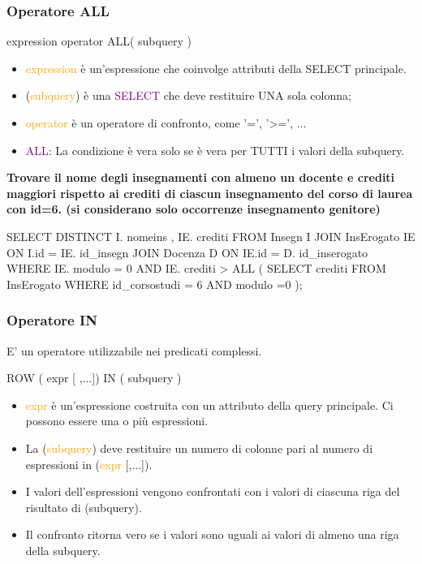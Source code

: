 \subsubsection{Operatore ALL}
\begin{codiceSQL}
  expression operator ALL( subquery )
\end{codiceSQL}

\begin{itemize}
  \item  \textcolor{orange}{expression} è un’espressione che coinvolge attributi della SELECT principale.
  \item (\textcolor{orange}{subquery}) è una \textcolor{purple}{SELECT} che deve restituire UNA sola colonna;
  \item \textcolor{orange}{operator} è un operatore di confronto, come ’=’, ’>=’, ...
  \item \textcolor{purple}{ALL}: La condizione è vera solo se è vera per TUTTI i valori della subquery.

\end{itemize}

\textbf{\large Trovare il nome degli insegnamenti con almeno un docente e crediti maggiori rispetto ai 
crediti di ciascun insegnamento del corso di laurea con id=6. (si considerano solo 
occorrenze insegnamento genitore)}

\begin{codiceSQL}
  SELECT DISTINCT I. nomeins , IE. crediti
FROM Insegn I 
  JOIN InsErogato IE ON I.id = IE. id_insegn
  JOIN Docenza D ON IE.id = D. id_inserogato
WHERE IE. modulo = 0 AND IE. crediti > ALL (
  SELECT crediti 
  FROM InsErogato
  WHERE id_corsostudi = 6 AND modulo =0
  );
\end{codiceSQL}

\subsubsection{Operatore IN}
E’ un operatore utilizzabile nei predicati complessi.
\begin{codiceSQL}
ROW ( expr [ ,...]) IN ( subquery )  
\end{codiceSQL}
\begin{itemize}
  \item \textcolor{orange}{expr} è un’espressione costruita con un attributo della query principale. Ci 
possono essere una o più espressioni.
\item La (\textcolor{orange}{subquery}) deve restituire un numero di colonne pari al numero di 
espressioni in (\textcolor{orange}{expr} [,...]).
\item I valori dell’espressioni vengono confrontati con i valori di ciascuna riga del 
risultato di (subquery).
\item Il confronto ritorna vero se i valori sono uguali ai valori di almeno una riga della 
subquery.
\end{itemize}




